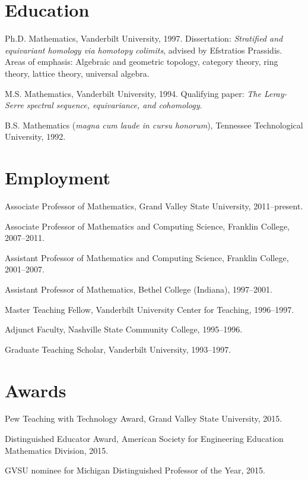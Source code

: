 \documentclass[letterpaper]{article}
\renewenvironment{itemize}{
  \begin{list}{}{
    \setlength{\leftmargin}{1.5em}
	\setlength{\itemsep}{0in}
  }
}{
  \end{list}
}
\begin{document}
\section*{Education}

\begin{itemize}
  \item Ph.D. Mathematics, Vanderbilt University, 1997. Dissertation: \emph{Stratified and equivariant homology via homotopy colimits}, advised by Efstratios Prassidis. Areas of emphasis: Algebraic and geometric topology, category theory, ring theory, lattice theory, universal algebra.


  \item M.S. Mathematics, Vanderbilt University, 1994. Qualifying paper: \emph{The Leray-Serre spectral sequence, equivariance, and cohomology}.

  \item B.S. Mathematics (\emph{magna cum laude in cursu honorum}), Tennessee Technological University, 1992.

\end{itemize}

\section*{Employment}

\begin{itemize}
\item Associate Professor of Mathematics, Grand Valley State University, 2011--present.
\item Associate Professor of Mathematics and Computing Science, Franklin College, 2007--2011.
\item Assistant Professor of Mathematics and Computing Science, Franklin College, 2001--2007.
\item Assistant Professor of Mathematics, Bethel College (Indiana), 1997--2001.
\item Master Teaching Fellow, Vanderbilt University Center for Teaching, 1996--1997.
\item Adjunct Faculty, Nashville State Community College, 1995--1996.
\item Graduate Teaching Scholar, Vanderbilt University, 1993--1997.
\end{itemize}


\section*{Awards}
\begin{itemize}
	\item Pew Teaching with Technology Award, Grand Valley State University, 2015.
	\item Distinguished Educator Award, American Society for Engineering Education Mathematics Division, 2015.
	\item GVSU nominee for Michigan Distinguished Professor of the Year, 2015.
\end{itemize}
\end{document}

